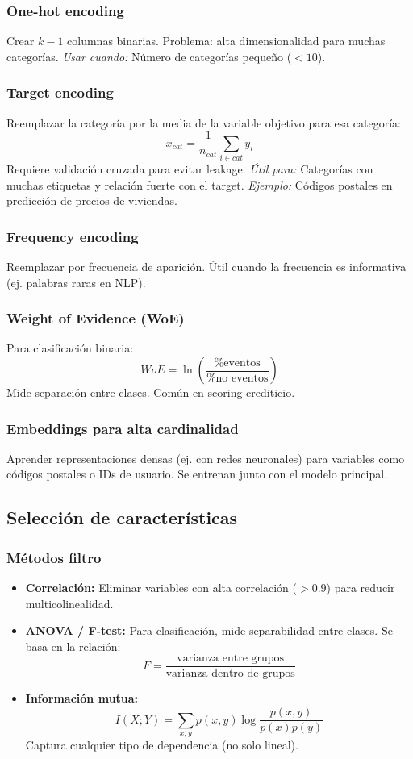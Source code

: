\documentclass[12pt,a4paper,openany,oneside]{book}
\begin{document}
\subsubsection{One-hot encoding}
Crear $k-1$ columnas binarias. Problema: alta dimensionalidad para muchas categorías. \textit{Usar cuando:} Número de categorías pequeño ($<10$).

\subsubsection{Target encoding}
Reemplazar la categoría por la media de la variable objetivo para esa categoría:
\[
x_{cat} = \frac{1}{n_{cat}} \sum_{i \in cat} y_i
\]
Requiere validación cruzada para evitar leakage. \textit{Útil para:} Categorías con muchas etiquetas y relación fuerte con el target. \textit{Ejemplo:} Códigos postales en predicción de precios de viviendas.

\subsubsection{Frequency encoding}
Reemplazar por frecuencia de aparición. Útil cuando la frecuencia es informativa (ej. palabras raras en NLP).

\subsubsection{Weight of Evidence (WoE)}
Para clasificación binaria:
\[
WoE = \ln\left(\frac{\% \text{eventos}}{\% \text{no eventos}}\right)
\]
Mide separación entre clases. Común en scoring crediticio.

\subsubsection{Embeddings para alta cardinalidad}
Aprender representaciones densas (ej. con redes neuronales) para variables como códigos postales o IDs de usuario. Se entrenan junto con el modelo principal.

\subsection{Selección de características}

\subsubsection{Métodos filtro}
\begin{itemize}
    \item \textbf{Correlación:} Eliminar variables con alta correlación ($>0.9$) para reducir multicolinealidad.
    \item \textbf{ANOVA / F-test:} Para clasificación, mide separabilidad entre clases. Se basa en la relación:
    \[
    F = \frac{\text{varianza entre grupos}}{\text{varianza dentro de grupos}}
    \]
    \item \textbf{Información mutua:}
    \[
    I(X;Y) = \sum_{x,y} p(x,y) \log\frac{p(x,y)}{p(x)p(y)}
    \]
    Captura cualquier tipo de dependencia (no solo lineal).
\end{itemize}
\end{document}
